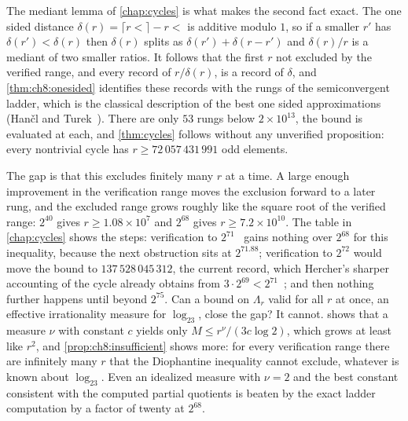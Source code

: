 The mediant lemma of \cref{chap:cycles} is what makes the second fact exact.
The one sided distance $\delta(r)=\lceil r\lt\rceil-r\lt$ is additive
modulo $1$, so if a smaller $r'$ has $\delta(r')<\delta(r)$ then $\delta(r)$
splits as $\delta(r')+\delta(r-r')$ and $\delta(r)/r$ is a mediant of two
smaller ratios.
It follows that the first $r$ not excluded by the verified range, and every record of $r/\delta(r)$, is a record of $\delta$, and \cref{thm:ch8:onesided} identifies these records with the rungs of the semiconvergent ladder, which is the classical description of the best one sided approximations
(Han\v{c}l and Turek~\cite[Theorem~4.5(ii)]{hancl2019}). There are only $53$ rungs below $2\times10^{13}$, the bound is
evaluated at each, and \cref{thm:cycles} follows without any unverified
proposition: every nontrivial cycle has $r\ge72\,057\,431\,991$ odd elements.

The gap is that this excludes finitely many $r$ at a time. A large enough improvement in
the verification range moves the exclusion forward to a later rung, and the
excluded range grows roughly like the square root of the verified range:
$2^{40}$ gives $r\ge1.08\times10^{7}$ and $2^{68}$ gives $r\ge7.2\times10^{10}$. The table in \cref{chap:cycles} shows the steps: verification
to $2^{71}$~\cite{barina2025} gains nothing over $2^{68}$ for this inequality, because the next obstruction sits
at $2^{71.88}$; verification to $2^{72}$ would move the bound to
$137\,528\,045\,312$, the current record, which Hercher's sharper accounting
of the cycle already obtains from $3\cdot2^{69}<2^{71}$~\cite[Corollary~29]{hercher2023};
and then nothing further happens until beyond $2^{75}$.
Can a bound on $\Lambda_r$ valid for all $r$ at once, an effective
irrationality measure for $\log_23$, close the gap? It cannot.
 shows that a measure $\nu$ with constant $c$ yields only
$M\le r^{\nu}/(3c\log2)$, which grows at least like $r^2$, and
\cref{prop:ch8:insufficient} shows more: for every verification range there
are infinitely many $r$ that the Diophantine inequality cannot exclude, whatever
is known about $\log_23$. Even an idealized measure with $\nu=2$ and the best
constant consistent with the computed partial quotients is beaten by the exact
ladder computation by a factor of twenty at $2^{68}$.

